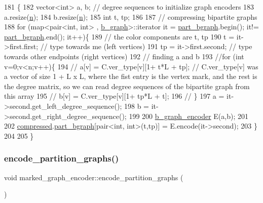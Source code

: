 \begin{DoxyCode}
181 \{
182   vector<int> a, b; \textcolor{comment}{// degree sequences to initialize graph encoders }
183   a.resize(\hyperlink{classmarked__graph__encoder_a4c66d9fdbc14c97523715aac7e4511cb}{n});
184   b.resize(\hyperlink{classmarked__graph__encoder_a4c66d9fdbc14c97523715aac7e4511cb}{n});
185   \textcolor{keywordtype}{int} t, tp;
186 
187   \textcolor{comment}{// compressing bipartite graphs }
188   \textcolor{keywordflow}{for} (map<pair<int, int> , \hyperlink{classb__graph}{b\_graph}>::iterator it = \hyperlink{classmarked__graph__encoder_a5faebef707fb681c0b6c2ccf64abc04c}{part\_bgraph}.begin(); it!=
      \hyperlink{classmarked__graph__encoder_a5faebef707fb681c0b6c2ccf64abc04c}{part\_bgraph}.end(); it++)\{
189     \textcolor{comment}{// the color components are t, tp}
190     t = it->first.first; \textcolor{comment}{// type towards me (left vertices)}
191     tp = it->first.second; \textcolor{comment}{// type towards other endpoints (right vertices)}
192     \textcolor{comment}{// finding a and b}
193     \textcolor{comment}{//for (int v=0;v<n;v++)\{}
194     \textcolor{comment}{//  a[v] = C.ver\_type[v][1+ t*L + tp]; // C.ver\_type[v] was a vector of size 1 + L x L, where the fist
       entry is the vertex mark, and the rest is the degree matrix, so we can read degree sequences of the
       bipartite graph from this array}
195     \textcolor{comment}{//  b[v] = C.ver\_type[v][1+ tp*L + t];}
196     \textcolor{comment}{// \}}
197     a = it->second.get\_left\_degree\_sequence();
198     b = it->second.get\_right\_degree\_sequence();
199 
200     \hyperlink{classb__graph__encoder}{b\_graph\_encoder} E(a,b);
201 
202     \hyperlink{classmarked__graph__encoder_ac2ded200860fdd2321f86dd76b28bcb3}{compressed}.\hyperlink{classmarked__graph__compressed_a7b3267063fba30b45eb21b3ba4e07536}{part\_bgraph}[pair<int, int>(t,tp)] = E.encode(it->second);
203   \}
204 
205 \}
\end{DoxyCode}
\mbox{\label{classmarked__graph__encoder_a654463d4b256b84225f5944b5e361ebf}} 
\subsubsection{\texorpdfstring{encode\+\_\+partition\+\_\+graphs()}{encode\_partition\_graphs()}}
{\footnotesize\ttfamily void marked\+\_\+graph\+\_\+encoder\+::encode\+\_\+partition\+\_\+graphs (\begin{DoxyParamCaption}{ }\end{DoxyParamCaption})\hspace{0.3cm}{\ttfamily [private]}}



